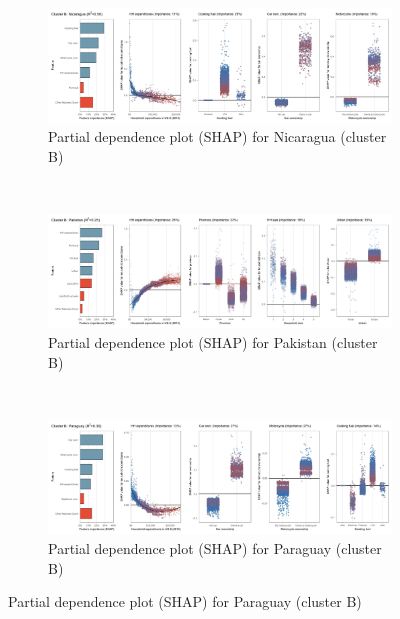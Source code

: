 \begin{figure}[ht!]\ContinuedFloat
    \centering
   \begin{subfigure}[b]{\textwidth}
    \centering
         \caption{Partial dependence plot (SHAP) for Nicaragua (cluster B)}
         \label{fig:5b_NIC}
         \includegraphics[width=\textwidth]{Figure 5b/Figure_5b_NIC}    
         \end{subfigure}
    \\
    \vspace{0.5cm}
   \begin{subfigure}[b]{\textwidth}
   \centering
         \caption{Partial dependence plot (SHAP) for Pakistan (cluster B)}
         \label{fig:5b_PAK}
         \includegraphics[width=\textwidth]{Figure 5b/Figure_5b_PAK}   
         \end{subfigure}
    \\
    \vspace{0.5cm}
   \begin{subfigure}[b]{\textwidth}
   \centering
         \caption{Partial dependence plot (SHAP) for Paraguay (cluster B)}
         \label{fig:5b_PRY}
         \includegraphics[width=\textwidth]{Figure 5b/Figure_5b_PRY}

\end{subfigure}
\end{figure}
